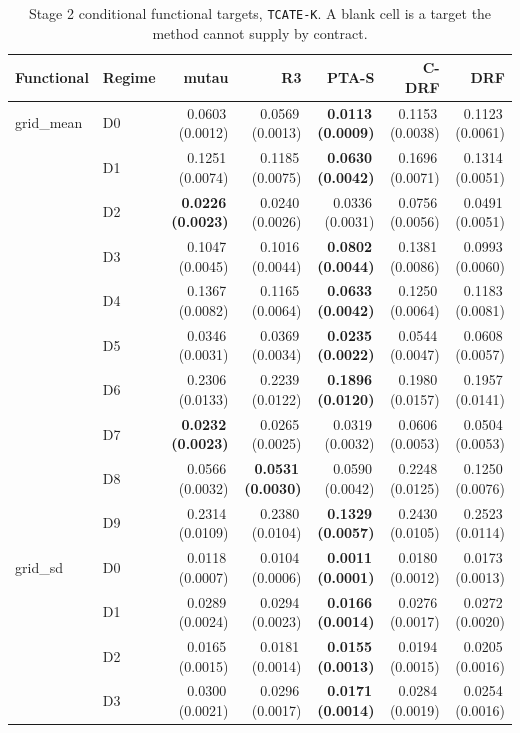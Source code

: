 \begin{table}[htbp]
\centering
\caption{Stage 2 conditional functional targets, \texttt{TCATE-K}. A blank cell is a target the method cannot supply by contract.}
\label{tab:p55s2-tcate}
\scriptsize
\setlength{\tabcolsep}{3.2pt}
\begin{tabular}{@{}llrrrrr@{}}
\toprule
Functional & Regime & mutau & R3 & PTA-S & C-DRF & DRF \\
\midrule
grid\_mean & D0 & 0.0603\,(0.0012) & 0.0569\,(0.0013) & \textbf{0.0113\,(0.0009)} & 0.1153\,(0.0038) & 0.1123\,(0.0061) \\
 & D1 & 0.1251\,(0.0074) & 0.1185\,(0.0075) & \textbf{0.0630\,(0.0042)} & 0.1696\,(0.0071) & 0.1314\,(0.0051) \\
 & D2 & \textbf{0.0226\,(0.0023)} & 0.0240\,(0.0026) & 0.0336\,(0.0031) & 0.0756\,(0.0056) & 0.0491\,(0.0051) \\
 & D3 & 0.1047\,(0.0045) & 0.1016\,(0.0044) & \textbf{0.0802\,(0.0044)} & 0.1381\,(0.0086) & 0.0993\,(0.0060) \\
 & D4 & 0.1367\,(0.0082) & 0.1165\,(0.0064) & \textbf{0.0633\,(0.0042)} & 0.1250\,(0.0064) & 0.1183\,(0.0081) \\
 & D5 & 0.0346\,(0.0031) & 0.0369\,(0.0034) & \textbf{0.0235\,(0.0022)} & 0.0544\,(0.0047) & 0.0608\,(0.0057) \\
 & D6 & 0.2306\,(0.0133) & 0.2239\,(0.0122) & \textbf{0.1896\,(0.0120)} & 0.1980\,(0.0157) & 0.1957\,(0.0141) \\
 & D7 & \textbf{0.0232\,(0.0023)} & 0.0265\,(0.0025) & 0.0319\,(0.0032) & 0.0606\,(0.0053) & 0.0504\,(0.0053) \\
 & D8 & 0.0566\,(0.0032) & \textbf{0.0531\,(0.0030)} & 0.0590\,(0.0042) & 0.2248\,(0.0125) & 0.1250\,(0.0076) \\
 & D9 & 0.2314\,(0.0109) & 0.2380\,(0.0104) & \textbf{0.1329\,(0.0057)} & 0.2430\,(0.0105) & 0.2523\,(0.0114) \\
\midrule
grid\_sd & D0 & 0.0118\,(0.0007) & 0.0104\,(0.0006) & \textbf{0.0011\,(0.0001)} & 0.0180\,(0.0012) & 0.0173\,(0.0013) \\
 & D1 & 0.0289\,(0.0024) & 0.0294\,(0.0023) & \textbf{0.0166\,(0.0014)} & 0.0276\,(0.0017) & 0.0272\,(0.0020) \\
 & D2 & 0.0165\,(0.0015) & 0.0181\,(0.0014) & \textbf{0.0155\,(0.0013)} & 0.0194\,(0.0015) & 0.0205\,(0.0016) \\
 & D3 & 0.0300\,(0.0021) & 0.0296\,(0.0017) & \textbf{0.0171\,(0.0014)} & 0.0284\,(0.0019) & 0.0254\,(0.0016) \\

\end{tabular}
\end{table}
